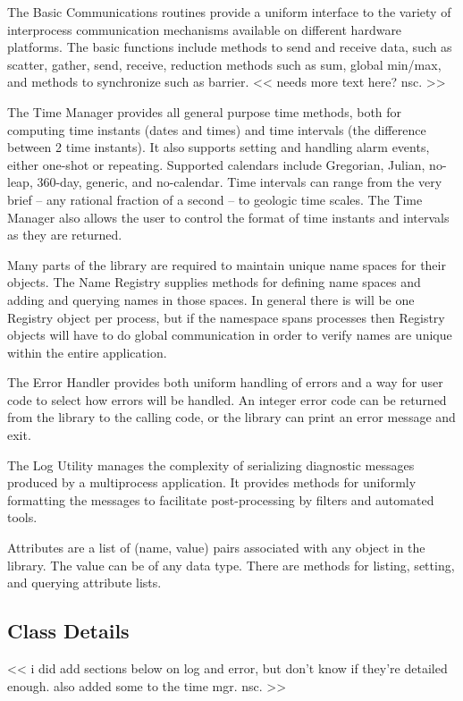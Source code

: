 The Basic Communications routines provide a uniform interface to
the variety of interprocess communication mechanisms available
on different hardware platforms.  
The basic functions include methods to send
and receive data, such as scatter, gather, send, receive,
reduction methods such as sum, global min/max, and methods
to synchronize such as barrier.
<< needs more text here?  nsc. >>

The Time Manager provides all general purpose time methods, both
for computing time instants (dates and times) and time intervals
(the difference between 2 time instants).   It also supports 
setting and handling alarm events, either one-shot or repeating.
Supported calendars include Gregorian, Julian, no-leap, 360-day, 
generic, and no-calendar.
Time intervals can range from the very brief -- any rational fraction
of a second -- to geologic time scales.
The Time Manager also allows the user to control the format of
time instants and intervals as they are returned.

Many parts of the library are required to maintain unique name
spaces for their objects.  The Name Registry supplies methods
for defining name spaces and adding and querying names in those
spaces.  In general there is will be one Registry object per
process, but if the namespace spans processes then Registry objects
will have to do global communication in order to verify names
are unique within the entire application.

The Error Handler provides both uniform handling of errors and
a way for user code to select how errors will be handled.
An integer error code can be returned from the library to the
calling code, or the library can print an error message and exit.

The Log Utility manages the complexity of serializing diagnostic
messages produced by a multiprocess application.  It provides
methods for uniformly formatting the messages to facilitate
post-processing by filters and automated tools.

Attributes are a list of (name, value) pairs associated with
any object in the library.  The value can be of any data type.
There are methods for listing, setting, and querying attribute lists.


\subsection{Class Details}

<< i did add sections below on log and error, but don't know if they're
detailed enough.  also added some to the time mgr.  nsc. >> 

